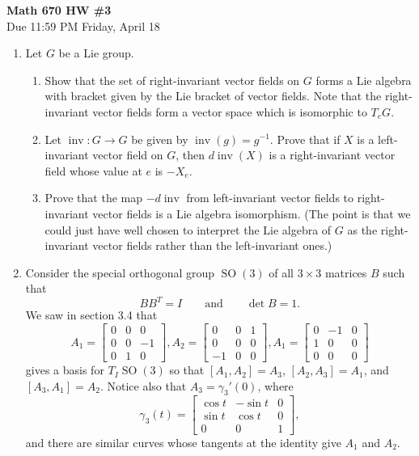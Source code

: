 \documentclass[11pt]{article}
\theoremstyle{definition}
\theoremstyle{definition}
\newcommand{\inv}{\operatorname{inv}}
\newcommand{\SO}{\operatorname{SO}}
\begin{document}
\begin{center}
{\Large\textbf{Math 670 HW \#3}}\\
Due 11:59 PM Friday, April 18
\end{center}




\begin{enumerate}	
	
	\item Let $G$ be a Lie group. 
	\begin{enumerate}
		\item Show that the set of right-invariant vector fields on $G$ forms a Lie algebra with bracket given by the Lie bracket of vector fields. Note that the right-invariant vector fields form a vector space which is isomorphic to $T_eG$.
		
		\item Let $\inv: G \to G$ be given by $\inv(g) = g^{-1}$. Prove that if $X$ is a left-invariant vector field on $G$, then $d\inv(X)$ is a right-invariant vector field whose value at $e$ is $-X_e$.
		
		\item Prove that the map $-d\inv$ from left-invariant vector fields to right-invariant vector fields is a Lie algebra isomorphism. (The point is that we could just have well chosen to interpret the Lie algebra of $G$ as the right-invariant vector fields rather than the left-invariant ones.)
	\end{enumerate}
	
	\item Consider the special orthogonal group $\SO(3)$ of all $3 \times 3$ matrices $B$ such that 
	\[
		B B^T = I \qquad \text{and} \qquad \det B = 1.
	\]
	We saw in section 3.4 that
	\[
		A_1 = \begin{bmatrix} 0 & 0 & 0 \\ 0 & 0 & -1 \\ 0 & 1 & 0 \end{bmatrix}, A_2 = \begin{bmatrix} 0 & 0 & 1 \\ 0 & 0 & 0 \\ -1 & 0 & 0 \end{bmatrix}, A_1 = \begin{bmatrix} 0 & -1 & 0 \\ 1 & 0 & 0 \\ 0 & 0 & 0 \end{bmatrix}
	\]
	gives a basis for $T_I\SO(3)$ so that $[A_1, A_2]=A_3$, $[A_2,A_3]=A_1$, and $[A_3,A_1]=A_2$. Notice also that $A_3 = \gamma_3'(0)$, where
	\[
		\gamma_3(t) = \begin{bmatrix} \cos t & -\sin t & 0 \\ \sin t & \cos t & 0 \\ 0 & 0 & 1 \end{bmatrix},
	\]
	and there are similar curves whose tangents at the identity give $A_1$ and $A_2$.
	

\end{enumerate}
\end{document}
